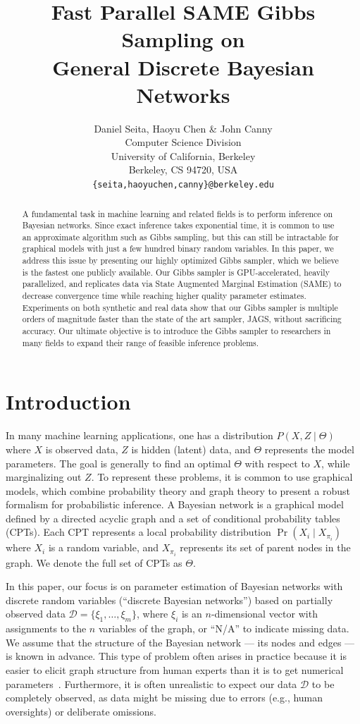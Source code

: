 \documentclass{article} %
\title{Fast Parallel SAME Gibbs Sampling on \\ General Discrete Bayesian Networks}
\author{Daniel Seita, Haoyu Chen \& John Canny \\
Computer Science Division \\
University of California, Berkeley \\
Berkeley, CS 94720, USA \\
\texttt{\{seita,haoyuchen,canny\}@berkeley.edu}
}
\begin{document}
\maketitle

\begin{abstract}
A fundamental task in machine learning and related fields is to perform inference on Bayesian
networks. Since exact inference takes exponential time, it is common to use an approximate algorithm
such as Gibbs sampling, but this can still be intractable for graphical models with just a few
hundred binary random variables. In this paper, we address this issue by presenting our highly
optimized Gibbs sampler, which we believe is the fastest one publicly available.  Our Gibbs
sampler is GPU-accelerated, heavily parallelized, and replicates data via State Augmented Marginal
Estimation (SAME) to decrease convergence time while reaching higher quality parameter estimates.
Experiments on both synthetic and real data show that our Gibbs sampler is multiple orders of
magnitude faster than the state of the art sampler, JAGS, without sacrificing accuracy. Our ultimate
objective is to introduce the Gibbs sampler to researchers in many fields to expand their range of
feasible inference problems.
\end{abstract}




\section{Introduction}\label{sec:intro}

In many machine learning applications, one has a distribution $P(X,Z \mid \Theta)$ where $X$ is
observed data, $Z$ is hidden (latent) data, and $\Theta$ represents the model parameters. The goal is
generally to find an optimal $\Theta$ with respect to $X$, while marginalizing out $Z$. To represent
these problems, it is common to use graphical models, which combine probability theory and graph
theory to present a robust formalism for probabilistic inference. A Bayesian network is a graphical
model defined by a directed acyclic graph and a set of conditional probability tables (CPTs). Each
CPT represents a local probability distribution $\Pr(X_i \mid X_{\pi_i})$ where $X_i$ is a random
variable, and $X_{\pi_i}$ represents its set of parent nodes in the graph. We denote the full set of
CPTs as $\Theta$.

In this paper, our focus is on parameter estimation of Bayesian networks with discrete random
variables (``discrete Bayesian networks'') based on partially observed data $\mathcal{D} = \{\xi_1,
\ldots, \xi_m\}$, where $\xi_i$ is an $n$-dimensional vector with assignments to the $n$ variables
of the graph, or ``N/A'' to indicate missing data. We assume that the structure of the Bayesian
network --- its nodes and edges --- is known in advance. This type of problem often arises in
practice because it is easier to elicit graph structure from human experts than it is to get
numerical parameters~\citep{Koller2009}. Furthermore, it is often unrealistic to expect our data
$\mathcal{D}$ to be completely observed, as data might be missing due to errors (e.g., human
oversights) or deliberate omissions.
\end{document}
